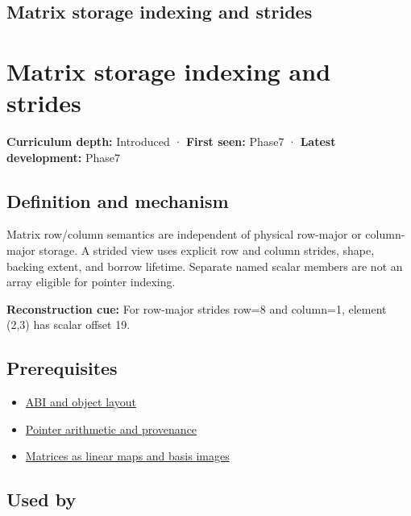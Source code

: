 \hypertarget{appendix-ffdc1d4e5350}{}
\section*{Matrix storage indexing and strides}
\chapter{Matrix storage indexing and strides}\label{appendix-ffdc1d4e5350-matrix-storage-indexing-and-strides}

\textbf{Curriculum depth:} Introduced · \textbf{First seen:} Phase7 · \textbf{Latest development:} Phase7

\section{Definition and mechanism}\label{appendix-ffdc1d4e5350-definition-and-mechanism}

Matrix row/column semantics are independent of physical row-major or column-major storage. A strided view uses explicit row and column strides, shape, backing extent, and borrow lifetime. Separate named scalar members are not an array eligible for pointer indexing.

\textbf{Reconstruction cue:} For row-major strides row=8 and column=1, element (2,3) has scalar offset 19.

\section{Prerequisites}\label{appendix-ffdc1d4e5350-prerequisites}

\begin{itemize}
\tightlist
\item
  \hyperref[appendix-c4ac6bb0fff8]{ABI and object layout}
\item
  \hyperref[appendix-6af5921bc853]{Pointer arithmetic and provenance}
\item
  \hyperref[appendix-bd39c3bf5d64]{Matrices as linear maps and basis images}
\end{itemize}

\section{Used by}\label{appendix-ffdc1d4e5350-used-by}

